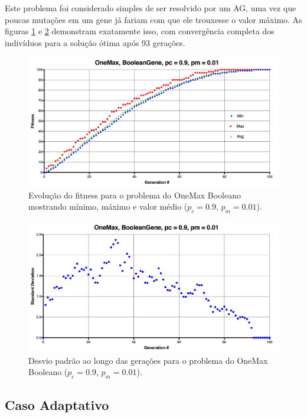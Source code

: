 Este problema foi considerado simples de ser resolvido por um AG, uma vez que poucas mutações em um gene já fariam com que ele trouxesse o valor máximo. As figuras \ref{fig:onemax_boolean} e \ref{fig:onemax_boolean_std} demonstram exatamente isso, com convergência completa dos indivíduos para a solução ótima após 93 gerações.

\begin{figure}[ht!]
    \centering \includegraphics[width=1.0\textwidth]{onemax_boolean.jpg}
    \caption{Evolução do fitness para o problema do OneMax Booleano mostrando mínimo, máximo e valor médio ($p_c=0.9$, $p_m=0.01$).}
    \label{fig:onemax_boolean}
\end{figure}

\begin{figure}[ht!]
    \centering \includegraphics[width=1.0\textwidth]{onemax_boolean_std.jpg}
    \caption{Desvio padrão ao longo das gerações para o problema do OneMax Booleano ($p_c=0.9$, $p_m=0.01$).}
    \label{fig:onemax_boolean_std}
\end{figure}

\subsection{Caso Adaptativo}

